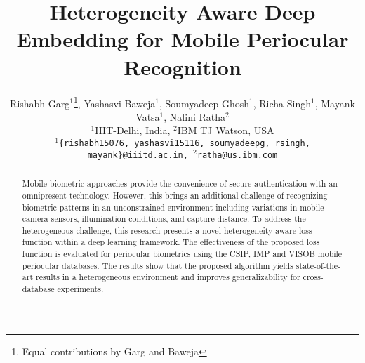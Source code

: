 \documentclass[10pt,twocolumn,letterpaper]{article}
\begin{document}
\title{Heterogeneity Aware Deep Embedding for Mobile Periocular Recognition}

\author{Rishabh Garg$^{1}$\thanks{Equal contributions by Garg and Baweja}, Yashasvi Baweja$^{1}$\footnotemark[1], Soumyadeep Ghosh$^{1}$, Richa Singh$^{1}$,  Mayank Vatsa$^{1}$, Nalini Ratha$^{2}$\\
$^{1}$IIIT-Delhi, India, $^{2}$IBM TJ Watson, USA\\
{\tt\small $^{1}$\{rishabh15076, yashasvi15116, soumyadeepg, rsingh, mayank\}@iiitd.ac.in, $^{2}$ratha@us.ibm.com}
}



\maketitle
\thispagestyle{empty}



\begin{abstract}
Mobile biometric approaches provide the convenience of secure authentication with an omnipresent technology. However, this brings an additional challenge of recognizing biometric patterns in an unconstrained environment including variations in mobile camera sensors, illumination conditions, and capture distance. To address the heterogeneous challenge, this research presents a novel heterogeneity aware loss function within a deep learning framework. The effectiveness of the proposed loss function is evaluated for periocular biometrics using the CSIP, IMP and VISOB mobile periocular databases. The results show that the proposed algorithm yields state-of-the-art results in a heterogeneous environment and improves generalizability for cross-database experiments.

\end{abstract}


\vspace{-10pt}
\end{document}
